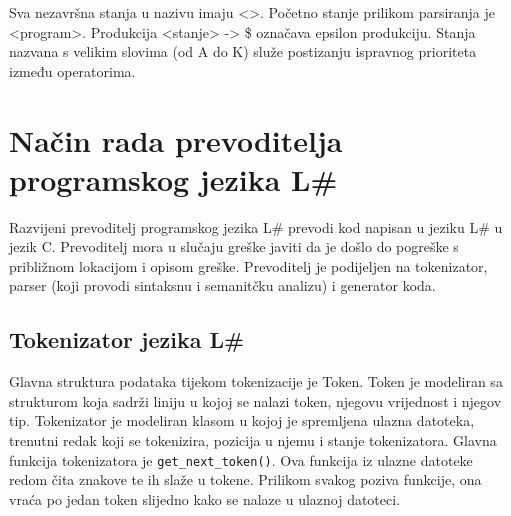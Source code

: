 \documentclass[times, utf8, zavrsni]{fer}
\begin{document}
Sva nezavršna stanja u nazivu imaju <>. Početno stanje prilikom parsiranja je <program>. Produkcija <stanje> -> \$
označava epsilon produkciju. Stanja nazvana s velikim slovima (od A do K) služe postizanju ispravnog prioriteta 
između operatorima.

\chapter{Način rada prevoditelja programskog jezika L\#}
Razvijeni prevoditelj programskog jezika L\# prevodi kod napisan u jeziku L\# u jezik C. Prevoditelj
mora u slučaju greške javiti da je došlo do pogreške s približnom lokacijom i opisom greške. Prevoditelj
je podijeljen na tokenizator, parser (koji provodi sintaksnu i semanitčku analizu) i generator koda.

\section{Tokenizator jezika L\#}
Glavna struktura podataka tijekom tokenizacije je Token. Token je modeliran sa strukturom koja sadrži liniju u kojoj se nalazi token,
njegovu vrijednost i njegov tip. Tokenizator je modeliran klasom u kojoj je spremljena ulazna datoteka, trenutni redak koji se tokenizira, pozicija u njemu 
i stanje tokenizatora. Glavna funkcija tokenizatora je \verb|get_next_token()|. Ova funkcija iz
ulazne datoteke redom čita znakove te ih slaže u tokene. Prilikom svakog poziva funkcije, ona vraća po jedan token
slijedno kako se nalaze u ulaznoj datoteci.
\end{document}
